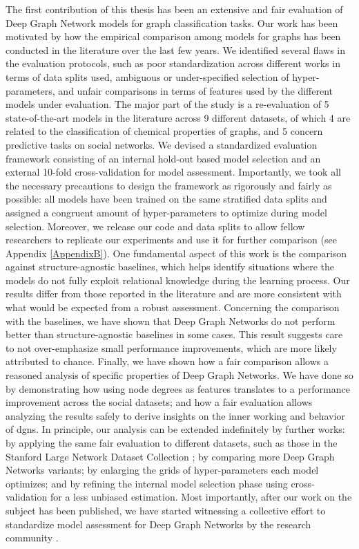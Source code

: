 The first contribution of this thesis has been an extensive and fair evaluation of Deep Graph Network models for graph classification tasks. Our work has been motivated by how the empirical comparison among models for graphs has been conducted in the literature over the last few years. We identified several flaws in the evaluation protocols, such as poor standardization across different works in terms of data splits used, ambiguous or under-specified selection of hyper-parameters, and unfair comparisons in terms of features used by the different models under evaluation. The major part of the study is a re-evaluation of 5 state-of-the-art models in the literature across 9 different datasets, of which 4 are related to the classification of chemical properties of graphs, and 5 concern predictive tasks on social networks. We devised a standardized evaluation framework consisting of an internal hold-out based model selection and an external 10-fold cross-validation for model assessment. Importantly, we took all the necessary precautions to design the framework as rigorously and fairly as possible: all models have been trained on the same stratified data splits and assigned a congruent amount of hyper-parameters to optimize during model selection. Moreover, we release our code and data splits to allow fellow researchers to replicate our experiments and use it for further comparison (see Appendix \ref{AppendixB}). One fundamental aspect of this work is the comparison against structure-agnostic baselines, which helps identify situations where the models do not fully exploit relational knowledge during the learning process. Our results differ from those reported in the literature and are more consistent with what would be expected from a robust assessment. Concerning the comparison with the baselines, we have shown that Deep Graph Networks do not perform better than structure-agnostic baselines in some cases. This result suggests care to not over-emphasize small performance improvements, which are more likely attributed to chance. Finally, we have shown how a fair comparison allows a reasoned analysis of specific properties of Deep Graph Networks. We have done so by demonstrating how using node degrees as features translates to a performance improvement across the social datasets; and how a fair evaluation allows analyzing the results safely to derive insights on the inner working and behavior of \glspl{dgn}. In principle, our analysis can be extended indefinitely by further works: by applying the same fair evaluation to different datasets, such as those in the Stanford Large Network Dataset Collection \cite{leskovec2014snap}; by comparing more Deep Graph Networks variants; by enlarging the grids of hyper-parameters each model optimizes; and by refining the internal model selection phase using cross-validation for a less unbiased estimation. Most importantly, after our work on the subject has been published, we have started witnessing a collective effort to standardize model assessment for Deep Graph Networks by the research community \citep{hu2020ogb,morris2020tudatasets}.
\vspace{1em}

